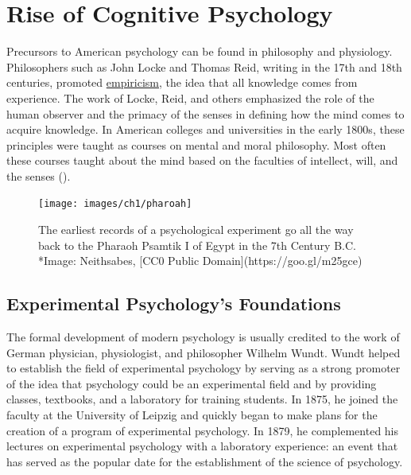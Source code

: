 \documentclass[
]{krantz}
\begin{document}
\section{Rise of Cognitive Psychology}\label{rise-of-cognitive-psychology}

Precursors to American psychology can be found in philosophy and physiology. Philosophers such as John Locke and Thomas Reid, writing in the 17th and 18th centuries, promoted \hyperref[empiricism]{empiricism}, the idea that all knowledge comes from experience. The work of Locke, Reid, and others emphasized the role of the human observer and the primacy of the senses in defining how the mind comes to acquire knowledge. In American colleges and universities in the early 1800s, these principles were taught as courses on mental and moral philosophy. Most often these courses taught about the mind based on the faculties of intellect, will, and the senses ().

\begin{figure}

{\centering \texttt{[image: images/ch1/pharoah]} 

}

\caption{The earliest records of a psychological experiment go all the way back to the Pharaoh Psamtik I of Egypt in the 7th Century B.C. *Image: Neithsabes, [CC0 Public Domain](https://goo.gl/m25gce)}\label{fig:pharoah}
\end{figure}

\subsection*{Experimental Psychology's Foundations}\label{experimental-psychologys-foundations}


The formal development of modern psychology is usually credited to the work of German physician, physiologist, and philosopher Wilhelm Wundt. Wundt helped to establish the field of experimental psychology by serving as a strong promoter of the idea that psychology could be an experimental field and by providing classes, textbooks, and a laboratory for training students. In 1875, he joined the faculty at the University of Leipzig and quickly began to make plans for the creation of a program of experimental psychology. In 1879, he complemented his lectures on experimental psychology with a laboratory experience: an event that has served as the popular date for the establishment of the science of psychology.
\end{document}
